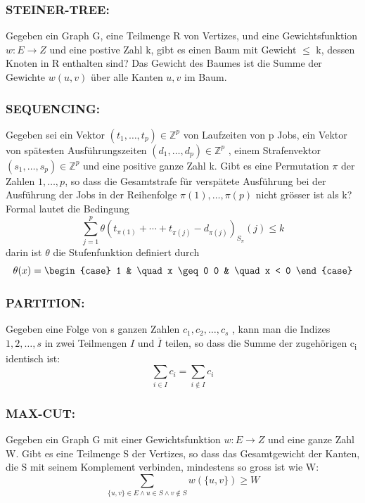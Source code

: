 \documentclass[11pt,twoside,landscape]{article}
\begin{document}
\begin{multicols}{3}
\subsubsection*{STEINER-TREE:}
\label{sec:orgf7d43da}
Gegeben ein Graph G, eine Teilmenge R von Vertizes, und eine Gewichtsfunktion \(w: E \rightarrow Z\) und eine postive Zahl k, gibt es einen Baum mit Gewicht \(\le\) k, dessen Knoten in R enthalten sind? Das Gewicht des Baumes ist die Summe der Gewichte \(w({u, v})\) über alle Kanten \({u, v}\) im Baum.

\subsubsection*{SEQUENCING:}
\label{sec:org444a586}
Gegeben sei ein Vektor \((t_1 , \dots , t_p) \in \mathbb{Z}^p\) von Laufzeiten von p Jobs, ein Vektor von spätesten Ausführungszeiten \((d_1 , \dots , d_p) \in \mathbb{Z}^p\) , einem Strafenvektor \((s_1 , \dots, s_p) \in \mathbb{Z}^p\) und eine positive ganze Zahl k. Gibt es eine Permutation \(\pi\) der Zahlen \(1, \dots, p\), so dass die Gesamtstrafe für verspätete Ausführung bei der Ausführung der Jobs in der Reihenfolge \(\pi(1), \dots, \pi(p)\) nicht grösser ist als k? Formal lautet die Bedingung
$$
\sum_{j=1}^p \theta (t_{\pi(1)} + \cdots + t_{\pi(j)} - d_{\pi(j)})_S_\pi(j) \leq k
$$
darin ist $\theta$ die Stufenfunktion definiert durch
$$
\theta(x) = \begin{case}
1 & \quad x \geq 0
0 & \quad x < 0
\end{case}
$$

\subsubsection*{PARTITION:}
\label{sec:org77520c3}
Gegeben eine Folge von s ganzen Zahlen \(c_1 , c_2 , \dots, c_s\) , kann man die Indizes \(1, 2, \dots , s\) in zwei Teilmengen \(I\) und \(\overline{I}\) teilen, so dass die Summe der zugehörigen c\textsubscript{i}
identisch ist:
$$
\sum_{i \in I} c_i = \sum_{i \notin I} c_i
$$

\subsubsection*{MAX-CUT:}
\label{sec:org9a282b9}
Gegeben ein Graph G mit einer Gewichtsfunktion \(w : E \rightarrow Z\) und eine ganze Zahl W. Gibt es eine Teilmenge S der Vertizes, so dass das Gesamtgewicht der Kanten, die S mit seinem Komplement verbinden, mindestens so gross ist wie W:
$$
\sum_{\{u,v\}\in E\wedge u\in S\wedge v\not\in S} w(\{u,v\})\ge W
$$


\end{multicols}
\end{document}
